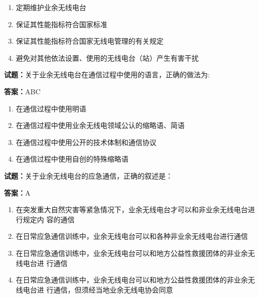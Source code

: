 \documentclass{ctexbook}
\begin{document}
\begin{enumerate}[leftmargin=3em]
  \item 定期维护业余无线电台 

  \item 保证其性能指标符合国家标准 

  \item 保证其性能指标符合国家无线电管理的有关规定 

  \item 避免对其他依法设置、使用的无线电台（站）产生有害干扰 

\end{enumerate}





\vspace{1em}

\textbf{试题：}关于业余无线电台在通信过程中使用的语言，正确的做法为: 

\textbf{答案：}ABC 

\begin{enumerate}[leftmargin=3em]
  \item 在通信过程中使用明语 

  \item 在通信过程中使用业余无线电领域公认的缩略语、简语 

  \item 在通信过程中使用公开的技术体制和通信协议 

  \item 在通信过程中使用自创的特殊缩略语 

\end{enumerate}






\vspace{1em}

\textbf{试题：}关于业余无线电台的应急通信，正确的叙述是： 

\textbf{答案：}A 

\begin{enumerate}[leftmargin=3em]
  \item 在突发重大自然灾害等紧急情况下，业余无线电台才可以和非业余无线电台进行规定内
容的通信 

  \item 在日常应急通信训练中，业余无线电台可以和各种非业余无线电台进行通信 

  \item 在日常应急通信训练中，业余无线电台可以和地方公益性救援团体的非业余无线电台进
行通信 

  \item 在日常应急通信训练中，业余无线电台可以和地方公益性救援团体的非业余无线电台进
行通信，但须经当地业余无线电协会同意 

\end{enumerate}
\end{document}
